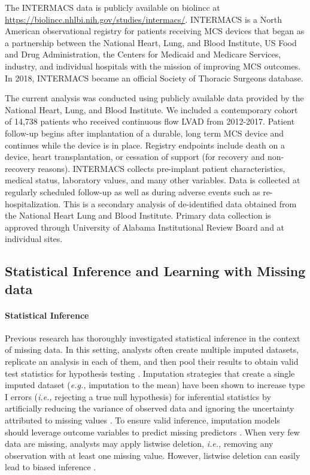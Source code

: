 \documentclass{article}
\begin{document}
\label{subsec:intermacs}

The INTERMACS data is publicly available on biolincc at
\url{https://biolincc.nhlbi.nih.gov/studies/intermacs/}. INTERMACS is a
North American observational registry for patients receiving MCS devices
that began as a partnership between the National Heart, Lung, and Blood
Institute, US Food and Drug Administration, the Centers for Medicaid and
Medicare Services, industry, and individual hospitals with the mission
of improving MCS outcomes. In 2018, INTERMACS became an official Society
of Thoracic Surgeons database.

The current analysis was conducted using publicly available data
provided by the National Heart, Lung, and Blood Institute. We included a
contemporary cohort of 14,738 patients who received continuous flow LVAD
from 2012-2017. Patient follow-up begins after implantation of a
durable, long term MCS device and continues while the device is in
place. Registry endpoints include death on a device, heart
transplantation, or cessation of support (for recovery and non-recovery
reasons). INTERMACS collects pre-implant patient characteristics,
medical status, laboratory values, and many other variables. Data is
collected at regularly scheduled follow-up as well as during adverse
events such as re-hospitalization. This is a secondary analysis of
de-identified data obtained from the National Heart Lung and Blood
Institute. Primary data collection is approved through University of
Alabama Institutional Review Board and at individual sites.

\hypertarget{statistical-inference-and-learning-with-missing-data}{%
\subsection{Statistical Inference and Learning with Missing
data}\label{statistical-inference-and-learning-with-missing-data}}

\label{subsec:inference_and_learning}

\paragraph{Statistical Inference}

Previous research has thoroughly investigated statistical inference in
the context of missing data. In this setting, analysts often create
multiple imputed datasets, replicate an analysis in each of them, and
then pool their results to obtain valid test statistics for hypothesis
testing \cite{rubin2004multiple}. Imputation strategies that create a
single imputed dataset (\textit{e.g., }imputation to the mean) have been
shown to increase type I errors (\textit{i.e., }rejecting a true null
hypothesis) for inferential statistics by artificially reducing the
variance of observed data and ignoring the uncertainty attributed to
missing values \cite{van2018flexible}. To ensure valid inference,
imputation models should leverage outcome variables to predict missing
predictors \cite{sterne2009multiple}. When very few data are missing,
analysts may apply listwise deletion, \textit{i.e., }removing any
observation with at least one missing value. However, listwise deletion
can easily lead to biased inference \cite{van2020rebutting}.
\end{document}
